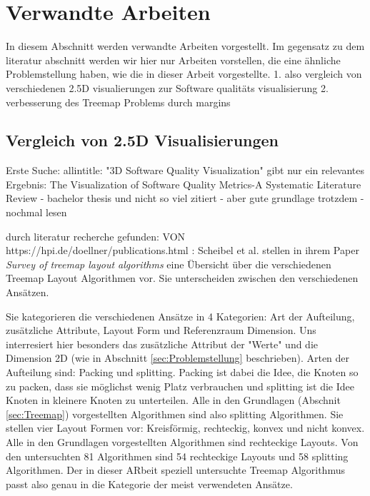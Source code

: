 \section{Verwandte Arbeiten} \label{sec:VerwandteArbeiten}
In diesem Abschnitt werden verwandte Arbeiten vorgestellt.
Im gegensatz zu dem literatur abschnitt werden wir hier nur Arbeiten vorstellen, die eine ähnliche Problemstellung haben, wie die in dieser Arbeit vorgestellte.
1. also vergleich von verschiedenen 2.5D visualierungen zur Software qualitäts visualisierung
2. verbesserung des Treemap Problems durch margins



\subsection{Vergleich von 2.5D Visualisierungen}

Erste Suche: allintitle: "3D Software Quality Visualization"
gibt nur ein relevantes Ergebnis:
The Visualization of Software Quality Metrics-A Systematic Literature Review
- bachelor thesis und nicht so viel zitiert
- aber gute grundlage trotzdem 
- nochmal lesen


durch literatur recherche gefunden: VON https://hpi.de/doellner/publications.html :
Scheibel et al. stellen in ihrem Paper \textit{Survey of treemap layout algorithms}\cite{scheibel2020survey} eine Übersicht über die verschiedenen Treemap Layout Algorithmen vor. Sie unterscheiden zwischen den verschiedenen Ansätzen. 

Sie kategorieren die verschiedenen Ansätze in 4 Kategorien: Art der Aufteilung, zusätzliche Attribute, Layout Form und Referenzraum Dimension. 
Uns interresiert hier besonders das zusätzliche Attribut der "Werte" und die Dimension 2D (wie in Abschnitt \ref{sec:Problemstellung} beschrieben).
Arten der Aufteilung sind: Packing und splitting. Packing ist dabei die Idee, die Knoten so zu packen, dass sie möglichst wenig Platz verbrauchen und splitting ist die Idee Knoten in kleinere Knoten zu unterteilen. Alle in den Grundlagen (Abschnit \ref{sec:Treemap}) vorgestellten Algorithmen sind also splitting Algorithmen.
Sie stellen vier Layout Formen vor: Kreisförmig, rechteckig, konvex und nicht konvex. Alle in den Grundlagen vorgestellten Algorithmen sind rechteckige Layouts.
Von den untersuchten 81 Algorithmen sind 54 rechteckige Layouts und 58 splitting Algorithmen. Der in dieser ARbeit speziell untersuchte Treemap Algorithmus passt also genau in die Kategorie der meist verwendeten Ansätze.


